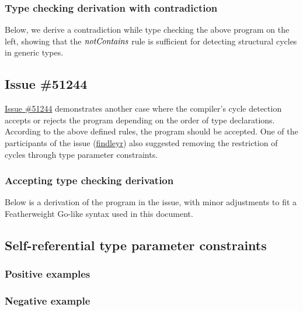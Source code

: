 \documentclass[12pt]{article}
\begin{document}
\subsubsection{Type checking derivation with contradiction}

Below, we derive a contradiction while type checking the above program on the
left, showing that the $\mathit{notContains}$ rule is sufficient for detecting structural
cycles in generic types.



\subsection{Issue \#51244}

\href{https://github.com/golang/go/issues/51244}{Issue \#51244} demonstrates
another case where the compiler's cycle detection accepts or rejects the program
depending on the order of type declarations. According to the above defined
rules, the program should be accepted. One of the participants of the issue
(\href{https://github.com/findleyr}{findleyr}) also suggested removing the
restriction of cycles through type parameter constraints.

\subsubsection{Accepting type checking derivation}


\noindent
Below is a derivation of the program in the issue, with minor adjustments to
fit a Featherweight Go-like syntax used in this document.




\subsection{Self-referential type parameter constraints}

\subsubsection{Positive examples}


\subsubsection{Negative example}
\end{document}
